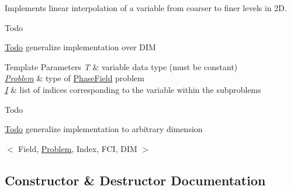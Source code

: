 Implements linear interpolation of a variable from coarser to finer levels in 2D. 

\begin{DoxyRefDesc}{Todo}
\item[\hyperlink{todo__todo000002}{Todo}]generalize implementation over D\+IM\end{DoxyRefDesc}



\begin{DoxyTemplParams}{Template Parameters}
{\em T} & variable data type (must be constant) \\
\hline
{\em \hyperlink{classUintah_1_1PhaseField_1_1Problem}{Problem}} & type of \hyperlink{namespaceUintah_1_1PhaseField}{Phase\+Field} problem \\
\hline
{\em \hyperlink{structUintah_1_1PhaseField_1_1I}{I}} & list of indices corresponding to the variable within the subproblems\\
\hline
\end{DoxyTemplParams}
\begin{DoxyRefDesc}{Todo}
\item[\hyperlink{todo__todo000003}{Todo}]generalize implementation to arbitrary dimension\end{DoxyRefDesc}


$<$ Field, \hyperlink{classUintah_1_1PhaseField_1_1Problem}{Problem}, Index, F\+CI, D\+IM $>$ 

\subsection{Constructor \& Destructor Documentation}
\mbox{\label{classUintah_1_1PhaseField_1_1detail_1_1amr__interpolator_3_01ScalarField_3_01T_01_4_00_01Problemd2db9de1754b5450c93c191a9275f5ed_a5f8bf03fb74a723290420d7aaabe31d2}} 
